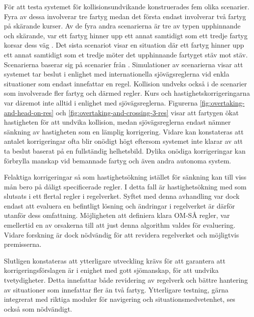 För att testa systemet för kollisionsundvikande konstruerades fem olika scenarier. Fyra av dessa involverar tre fartyg medan det första endast involverar två fartyg på skärande kurser.  Av de fyra andra scenarierna är tre av typen upphinnande och skärande, var ett fartyg hinner upp ett annat samtidigt som ett tredje fartyg korsar dess väg . Det sista scenariot visar en situation där ett fartyg hinner upp ett annat samtidigt som et tredje möter det upphinnande fartyget stäv mot stäv.  Scenarierna baserar sig på scenarier från \textcite{ecolreg_overtaking-and-crossing,ecolreg_overtaking-and-crossing-3,ecolreg_overtaking-and-crossing-2,ecolreg_overtaking-and-head-on}.  Simulationer av scenarierna visar att systemet tar beslut i  enlighet med   internationella sjövägsreglerna vid enkla situationer som endast innefattar en regel.  Kollision undveks också i de scenarier som involverade fler fartyg och därmed regler. Kurs och hastighetskorrigeringarna var däremot inte alltid i enlighet med sjövägsreglerna. Figurerna \ref{fig:overtaking-and-head-on-res} och \ref{fig:overtaking-and-crossing-3-res} visar att fartygen ökat hastigheten för att undvika kollision, medan sjövägsreglerna endast nämner sänkning av hastigheten som en lämplig korrigering. Vidare kan konstateras att antalet korrigeringar ofta blir onödigt högt  eftersom systemet inte klarar av att ta beslut baserat på en fullständig helhetsbild. Dylika onödiga korrigeringar kan förbrylla manskap vid bemannade fartyg och även andra autonoma system. 

Felaktiga korrigeringar så som  hastighetsökning istället för sänkning kan till viss mån  bero på dåligt specificerade regler. I detta fall är hastighetsökning med som slutsats i ett flertal regler i regelverket. Syftet med denna avhandling var dock endast att evaluera en befintligt lösning och ändringar i regelverket är därför utanför dess omfattning. Möjligheten att definiera klara OM-SÅ regler, var emellertid en av orsakerna till att just denna algorithm valdes för evaluering.  Vidare forskning är dock  nödvändig för att revidera regelverket och möjligtvis premisserna. 

Slutligen konstateras att ytterligare utveckling krävs för att garantera att korrigeringsförslagen är i enighet med  gott sjömanskap, för att undvika tvetydigheter. Detta innefattar både revidering av regelverk och bättre hantering av situationer som innefattar fler än två fartyg. Ytterligare testning, gärna integrerat med riktiga moduler för navigering och situationsmedvetenhet, ses också som nödvändigt.